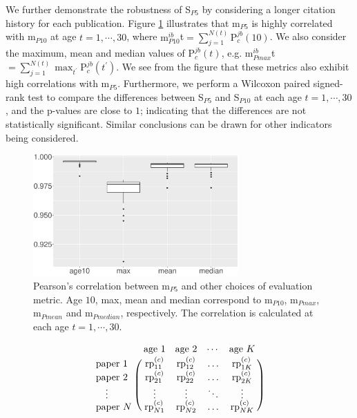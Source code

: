 \begin{refsection}
We further demonstrate the robustness of S$_{P5}$ by considering a longer citation history for each publication. Figure \ref{fig:robustness_test_cor} illustrates that m$_{P5}$ is highly correlated with m$_{P10}$ at age $t=1,\cdots,30$, where $\text{m}_{P10}^{ib}$t$= \sum_{j=1}^{N(t)} \text{P}_{c}^{jb}(10)$. We also consider the maximum, mean and median values of $\text{P}_{c}^{jb}(t)$, e.g. $\text{m}_{Pmax}^{ib}$t$= \sum_{j=1}^{N(t)} \max_{t^\prime}\text{P}_{c}^{jb}(t^\prime)$. We see from the figure that these metrics also exhibit high correlations with m$_{P5}$. Furthermore, we perform a Wilcoxon paired signed-rank test to compare the differences between S$_{P5}$ and S$_{P10}$ at each age $t=1,\cdots,30$, and the p-values are close to $1$; indicating that the differences are not statistically significant. Similar conclusions can be drawn for other indicators being considered.

\begin{figure}[ht!]
    \centering
    \includegraphics[width=0.7\textwidth]{figures/robustness/cor.eps}
    \caption[Correlation between m$_{P5}$ and other choices of evaluation metric]{Pearson's correlation between m$_{P5}$ and other choices of evaluation metric. Age $10$, max, mean and median correspond to m$_{P10}$, m$_{Pmax}$, m$_{Pmean}$ and m$_{Pmedian}$, respectively. The correlation is calculated at each age $t=1,\cdots,30$.}
    \label{fig:robustness_test_cor}
\end{figure}


\iffalse
\begin{equation}
\label{eq:rp_matrix}
\bordermatrix{
    & \text{age 1}     & \text{age 2}     & \cdots & \text{age $K$}     \cr
    \text{paper 1}     & \text{rp}_{11}^{(c)}     & \text{rp}_{12}^{(c)}     & \ldots & \text{rp}_{1 K}^{(c)}      \cr
    \text{paper 2}     & \text{rp}_{21}^{(c)}     & \text{rp}_{22}^{(c)}    & \ldots & \text{rp}_{2 K}^{(c)}     \cr
    \quad \vdots & \vdots & \vdots & \ddots & \vdots \cr
    \text{paper $N$}     & \text{rp}_{N 1}^{(c)}     & \text{rp}_{N 2}^{(c)}     & \ldots  & \text{rp}_{N K}^{(c)}    \cr
}
\end{equation}


\end{refsection}
